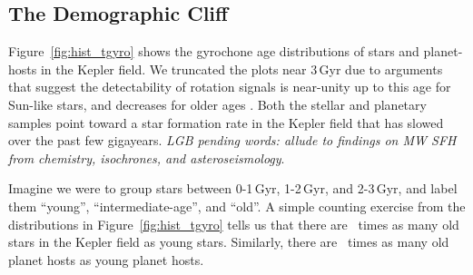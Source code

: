 \documentclass[11pt,twocolumn,tighten]{aastex63}
\begin{document}
\subsection{The Demographic Cliff}

Figure~\ref{fig:hist_tgyro} shows the gyrochone age distributions of
stars and planet-hosts in the Kepler field.
We truncated the plots near $3$\,Gyr due to arguments that suggest the
detectability of rotation signals is near-unity up to this age for
Sun-like stars, and decreases for older ages
\citep{2022ApJ...937...94M}.
Both the stellar and planetary samples point toward a star formation
rate in the Kepler field that has slowed over the past few gigayears.
{\it LGB pending words: allude to findings on MW SFH from chemistry,
isochrones, and asteroseismology}.

%

Imagine we were to group stars between 0-1\,Gyr, 1-2\,Gyr, and
2-3\,Gyr, and label them ``young'', ``intermediate-age'', and ``old''.
A simple counting exercise from the distributions in
Figure~\ref{fig:hist_tgyro} tells us that there are \ratioobtoybstars\
times as many old stars in the Kepler field as young stars.
Similarly, there are \ratioobtoybplanets\ times as many old planet
hosts as young planet hosts. 
\end{document}
